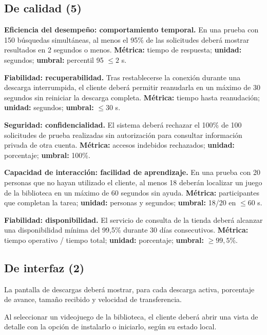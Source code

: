 \documentclass[12pt,a4paper]{article}
\begin{document}
\subsection{De calidad (5)}
\begin{description}[leftmargin=!,labelwidth=1.5cm]
\item[RC-01.] \textbf{Eficiencia del desempeño: comportamiento temporal.} En una prueba con 150 búsquedas simultáneas, al menos el 95\% de las solicitudes deberá mostrar resultados en 2 segundos o menos. \textbf{Métrica:} tiempo de respuesta; \textbf{unidad:} segundos; \textbf{umbral:} percentil 95 $\leq 2$ s.
\item[RC-02.] \textbf{Fiabilidad: recuperabilidad.} Tras restablecerse la conexión durante una descarga interrumpida, el cliente deberá permitir reanudarla en un máximo de 30 segundos sin reiniciar la descarga completa. \textbf{Métrica:} tiempo hasta reanudación; \textbf{unidad:} segundos; \textbf{umbral:} $\leq 30$ s.
\item[RC-03.] \textbf{Seguridad: confidencialidad.} El sistema deberá rechazar el 100\% de 100 solicitudes de prueba realizadas sin autorización para consultar información privada de otra cuenta. \textbf{Métrica:} accesos indebidos rechazados; \textbf{unidad:} porcentaje; \textbf{umbral:} 100\%.
\item[RC-04.] \textbf{Capacidad de interacción: facilidad de aprendizaje.} En una prueba con 20 personas que no hayan utilizado el cliente, al menos 18 deberán localizar un juego de la biblioteca en un máximo de 60 segundos sin ayuda. \textbf{Métrica:} participantes que completan la tarea; \textbf{unidad:} personas y segundos; \textbf{umbral:} 18/20 en $\leq 60$ s.
\item[RC-05.] \textbf{Fiabilidad: disponibilidad.} El servicio de consulta de la tienda deberá alcanzar una disponibilidad mínima del 99,5\% durante 30 días consecutivos. \textbf{Métrica:} tiempo operativo / tiempo total; \textbf{unidad:} porcentaje; \textbf{umbral:} $\geq 99,5\%$.
\end{description}

\subsection{De interfaz (2)}
\begin{description}[leftmargin=!,labelwidth=1.5cm]
\item[RI-01.] La pantalla de descargas deberá mostrar, para cada descarga activa, porcentaje de avance, tamaño recibido y velocidad de transferencia.
\item[RI-02.] Al seleccionar un videojuego de la biblioteca, el cliente deberá abrir una vista de detalle con la opción de instalarlo o iniciarlo, según su estado local.
\end{description}
\end{document}
